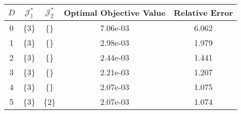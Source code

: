 \begin{subtable}{\textwidth}
\centering
\begin{tabular}{|c|c|c|c|c|}
  \hline
$D$ & $\mathcal J_1^*$ & $\mathcal J_2^*$ & Optimal Objective Value & Relative Error \\ 
  \hline
0 & \{3\} & \{\} & 7.06e-03 & 6.062 \\ 
  1 & \{3\} & \{\} & 2.98e-03 & 1.979 \\ 
  2 & \{3\} & \{\} & 2.44e-03 & 1.441 \\ 
  3 & \{3\} & \{\} & 2.21e-03 & 1.207 \\ 
  4 & \{3\} & \{\} & 2.07e-03 & 1.075 \\ 
  5 & \{3\} & \{2\} & 2.07e-03 & 1.074 \\ 
   \hline
\end{tabular}
\end{subtable}
